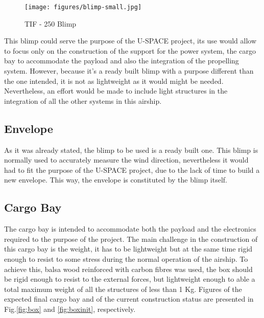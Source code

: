 \begin{figure}[bht]
\centering
\texttt{[image: figures/blimp-small.jpg]}
\caption{TIF - 250 Blimp}
\label{fig:blimp}
\end{figure}

This blimp could serve the purpose of the U-SPACE project, its use would allow to focus only on the construction of the support for the power system, the cargo bay to accommodate the payload and also the integration of the propelling system. However, because it's a ready built blimp with a purpose different than the one intended, it is not as lightweight as it would might be needed. Nevertheless, an effort would be made to include light structures in the integration of all the other systems in this airship.

\subsection{Envelope}

As it was already stated, the blimp to be used is a ready built one. This blimp is normally used to accurately measure the wind direction, nevertheless it would had to fit the purpose of the U-SPACE project, due to the lack of time to build a new envelope. This way, the envelope is constituted by the blimp itself.  

\subsection{Cargo Bay}

The cargo bay is intended to accommodate both the payload and the electronics required to the purpose of the project. The main challenge in the construction of this cargo bay is the weight, it has to be lightweight but at the same time rigid enough to resist to some stress during the normal operation of the airship. To achieve this, balsa wood reinforced with carbon fibres was used, the box should be rigid enough to resist to the external forces, but lightweight enough to able a total maximum weight of all the structures of less than 1 Kg. Figures of the expected final cargo bay and of the current construction status are presented in Fig.\ref{fig:box} and \ref{fig:boxinit}, respectively. 

